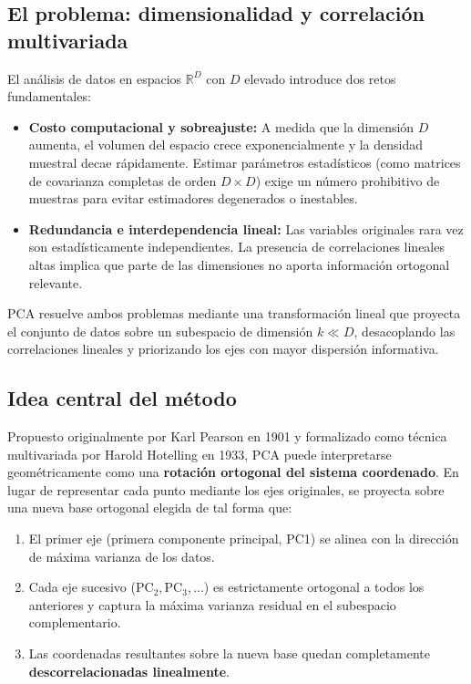 \documentclass[11pt,letterpaper]{article}
\begin{document}
	\subsection{El problema: dimensionalidad y correlación multivariada}
	
	El análisis de datos en espacios $\mathbb{R}^D$ con $D$ elevado introduce dos retos fundamentales:
	
	\begin{itemize}[itemsep=2pt]
		\item \textbf{Costo computacional y sobreajuste:} A medida que la dimensión $D$ aumenta, el volumen del espacio crece exponencialmente y la densidad muestral decae rápidamente. Estimar parámetros estadísticos (como matrices de covarianza completas de orden $D\times D$) exige un número prohibitivo de muestras para evitar estimadores degenerados o inestables.
		\item \textbf{Redundancia e interdependencia lineal:} Las variables originales rara vez son estadísticamente independientes. La presencia de correlaciones lineales altas implica que parte de las dimensiones no aporta información ortogonal relevante.
	\end{itemize}
	
	PCA resuelve ambos problemas mediante una transformación lineal que proyecta el conjunto de datos sobre un subespacio de dimensión $k \ll D$, desacoplando las correlaciones lineales y priorizando los ejes con mayor dispersión informativa.
	
	\subsection{Idea central del método}
	
	Propuesto originalmente por Karl Pearson en 1901 y formalizado como técnica multivariada por Harold Hotelling en 1933, PCA puede interpretarse geométricamente como una \textbf{rotación ortogonal del sistema coordenado}. En lugar de representar cada punto mediante los ejes originales, se proyecta sobre una nueva base ortogonal elegida de tal forma que:
	
	\begin{enumerate}[itemsep=2pt]
		\item El primer eje (primera componente principal, PC1) se alinea con la dirección de máxima varianza de los datos.
		\item Cada eje sucesivo ($\text{PC}_2, \text{PC}_3, \dots$) es estrictamente ortogonal a todos los anteriores y captura la máxima varianza residual en el subespacio complementario.
		\item Las coordenadas resultantes sobre la nueva base quedan completamente \textbf{descorrelacionadas linealmente}.
	\end{enumerate}
	
\end{document}
